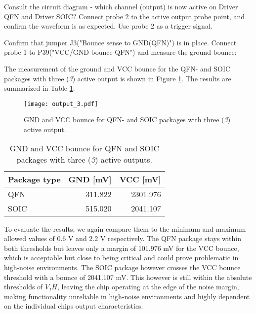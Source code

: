 \documentclass[../main.tex]{subfiles}
\begin{document}
\vspace{10pt}

Consult the circuit diagram - which channel (output) is now active on Driver QFN and Driver SOIC? Connect probe 2 to the active output probe point, and confirm the waveform is as expected. Use probe 2 as a trigger signal.

\vspace{10pt}

Confirm that jumper J3("Bounce sense to GND(QFN)") is in place. Connect probe 1 to P39("VCC/GND bounce QFN") and measure the ground bounce:

\solution

The measurement of the ground and VCC bounce for the QFN- and SOIC packages with three (\textit{3}) active output is shown in Figure \ref{fig:gnd_vcc_output_3}. The results are summarized in Table \ref{tab:output_3}.

\begin{figure}[h]
    \centering
    \texttt{[image: output\_3.pdf]}
    \caption{GND and VCC bounce for QFN- and SOIC packages with three (\textit{3}) active output.}
    \label{fig:gnd_vcc_output_3}
\end{figure}

\begin{table}[h]
    \centering
    \begin{tabular}{l | r r}
        \toprule[1pt]
        Package type    & GND [mV]  & VCC [mV]\\
        \midrule
        QFN             & 311.822   & 2301.976  \\
        SOIC            & 515.020   & 2041.107  \\
        \bottomrule[1pt]
    \end{tabular}
    \caption{GND and VCC bounce for QFN and SOIC packages with three (\textit{3}) active outputs.}
    \label{tab:output_3}
\end{table}

To evaluate the results, we again compare them to the minimum and maximum allowed values of 0.6 V and 2.2 V respectively. The QFN package stays within both thresholds but leaves only a margin of 101.976 mV for the VCC bounce, which is acceptable but close to being critical and could prove problematic in high-noise environments. The SOIC package however crosses the VCC bounce threshold with a bounce of 2041.107 mV. This however is still within the absolute thresholds of $V_IH$, leaving the chip operating at the edge of the noise margin, making functionality unreliable in high-noise environments and highly dependent on the individual chips output characteristics.
\end{document}
